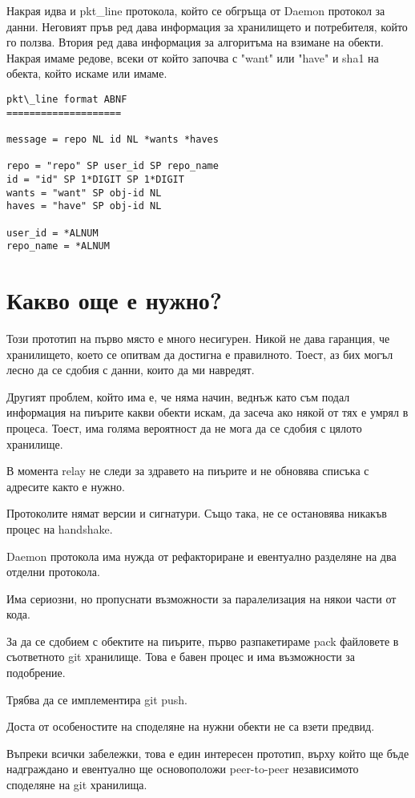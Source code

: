 \documentclass[a4paper,12pt]{article}
\begin{document}
Накрая идва и pkt\_line протокола, който се обгръща от Daemon протокол за данни.
Неговият пръв ред дава информация за хранилището и потребителя, който го ползва.
Втория ред дава информация за алгоритъма на взимане на обекти. Накрая имаме
редове, всеки от който започва с "want" или "have" и sha1 на обекта, който 
искаме или имаме.

\begin{verbatim}
pkt\_line format ABNF
====================

message = repo NL id NL *wants *haves

repo = "repo" SP user_id SP repo_name
id = "id" SP 1*DIGIT SP 1*DIGIT
wants = "want" SP obj-id NL
haves = "have" SP obj-id NL

user_id = *ALNUM
repo_name = *ALNUM
\end{verbatim}

\section{Какво още е нужно?}

Този прототип на първо място е много несигурен. Никой не дава гаранция, че 
хранилището, което се опитвам да достигна е правилното. Тоест, аз бих могъл
лесно да се сдобия с данни, които да ми навредят.

Другият проблем, който има е, че няма начин, веднъж като съм подал информация
на пиърите какви обекти искам, да засеча ако някой от тях е умрял в процеса.
Тоест, има голяма вероятност да не мога да се сдобия с цялото хранилище.

В момента relay не следи за здравето на пиърите и не обновява списъка с адресите
както е нужно.

Протоколите нямат версии и сигнатури. Също така, не се остановява никакъв процес
на handshake.

Daemon протокола има нужда от рефакториране и евентуално разделяне на два отделни
протокола.

Има сериозни, но пропуснати възможности за паралелизация на някои части от кода.

За да се сдобием с обектите на пиърите, първо разпакетираме pack файловете в
съответното git хранилище. Това е бавен процес и има възможности за подобрение.

Трябва да се имплементира git push.

Доста от особеностите на споделяне на нужни обекти не са взети предвид.

Въпреки всички забележки, това е един интересен прототип, върху който ще бъде
надграждано и евентуално ще основоположи peer-to-peer независимото споделяне
на git хранилища.
\end{document}
